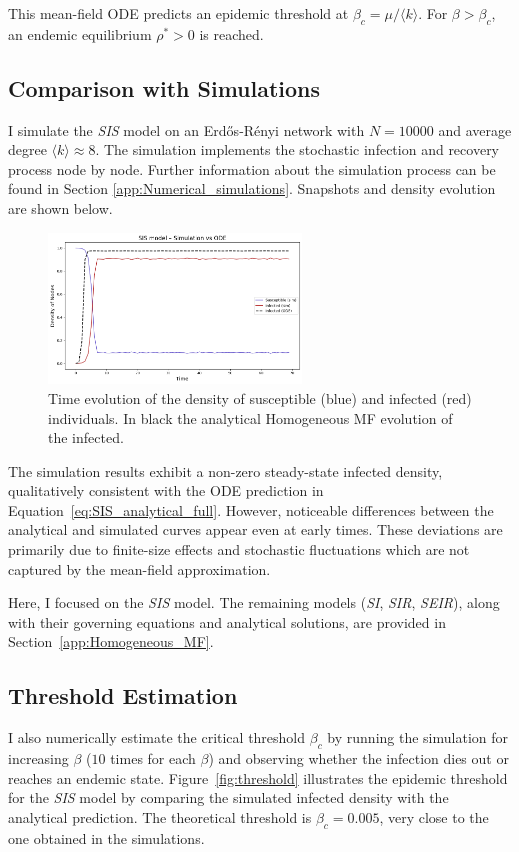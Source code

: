This mean-field ODE predicts an epidemic threshold at $\beta_c = \mu / \langle k \rangle$. For $\beta > \beta_c$, an endemic equilibrium $\rho^* > 0$ is reached.

\subsection{Comparison with Simulations}
I simulate the \textit{SIS} model on an Erd\H{o}s-Rényi network with $N=10000$ and average degree $\langle k \rangle \approx 8$. The simulation implements the stochastic infection and recovery process node by node. 
Further information about the simulation process can be found in Section \ref{app:Numerical_simulations}. Snapshots and density evolution are shown below.

\begin{figure}[H]
\centering
\includegraphics[width=0.6\textwidth]{images/Homogeneous/SIS_densities.png}
\caption{Time evolution of the density of susceptible (blue) and infected (red) individuals. In black the analytical Homogeneous MF evolution of the infected.}
\label{fig:SIS_densities}
\end{figure}

The simulation results exhibit a non-zero steady-state infected density, qualitatively consistent with the ODE prediction in Equation~\eqref{eq:SIS_analytical_full}. However, noticeable differences between the analytical and simulated curves appear even at early times. These deviations are primarily due to finite-size effects and stochastic fluctuations which are not captured by the mean-field approximation.

Here, I focused on the \textit{SIS} model. The remaining models (\textit{SI}, \textit{SIR}, \textit{SEIR}), along with their governing equations and analytical solutions, are provided in Section~\ref{app:Homogeneous_MF}.

\subsection{Threshold Estimation}
I also numerically estimate the critical threshold $\beta_c$ by running the simulation for increasing $\beta$ ($10$ times for each $\beta$) and observing whether the infection dies out or reaches an endemic state. 
Figure~\ref{fig:threshold} illustrates the epidemic threshold for the \textit{SIS} model by comparing the simulated infected density with the analytical prediction. The theoretical threshold is \(\beta_c = 0.005\), very close to the one obtained in the simulations.

